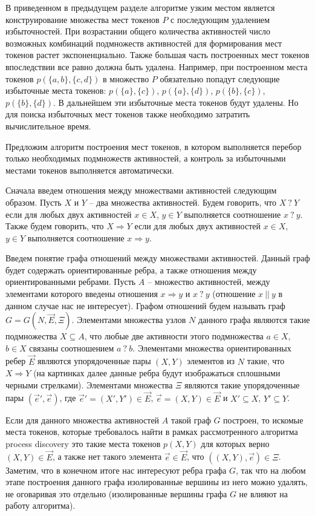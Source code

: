 \documentclass[
11pt,%
tightenlines,%
twoside,%
onecolumn,%
nofloats,%
nobibnotes,%
nofootinbib,%
superscriptaddress,%
noshowpacs,%
centertags]%
{revtex4}
\begin{document}
В приведенном в предыдущем разделе алгоритме узким местом является конструирование множества мест токенов $P$ с последующим удалением избыточностей.
При возрастании общего количества активностей число возможных комбинаций подмножеств активностей для формирования мест токенов растет экспоненциально.
Также большая часть построенных мест токенов впоследствии все равно должна быть удалена.
Например, при построенном места токенов $p(\{a, b\}, \{c, d\})$ в множество $P$ обязательно попадут следующие избыточные места токенов: $p(\{a\}, \{c\})$, $p(\{a\}, \{d\})$, $p(\{b\}, \{c\})$, $p(\{b\}, \{d\})$.
В дальнейшем эти избыточные места токенов будут удалены.
Но для поиска избыточных мест токенов также необходимо затратить вычислительное время.

Предложим алгоритм построения мест токенов, в котором выполняется перебор только необходимых подмножеств активностей, а контроль за избыточными местами токенов выполняется автоматически.

Сначала введем отношения между множествами активностей следующим образом.
Пусть $X$ и $Y$ -- два множества активностей.
Будем говорить, что $X \ ? \ Y$ если для любых двух активностей $x \in X$, $y \in Y$ выполняется соотношение $x \ ? \ y$.
Также будем говорить, что $X \Rightarrow Y$ если для любых двух активностей $x \in X$, $y \in Y$ выполняется соотношение $x \Rightarrow y$.

Введем понятие графа отношений между множествами активностей.
Данный граф будет содержать ориентированные ребра, а также отношения между ориентированными ребрами.
Пусть $A$ -- множество активностей, между элементами которого введены отношения $x \Rightarrow y$ и $x \ ? \ y$ (отношение $x \ || \ y$ в данном случае нас не интересует).
Графом отношений будем называть граф $G = G(N, \overrightarrow{E}, \Xi)$.
Элементами множества узлов $N$ данного графа являются такие подмножества $X \subseteq A$, что любые две активности этого подмножества $a \in X$, $b \in X$ связаны соотношением $a \ ? \ b$.
Элементами множества ориентированных ребер $\overrightarrow{E}$ являются упорядоченные пары $(X, Y)$ элементов из $N$ такие, что $X \Rightarrow Y$ (на картинках далее данные ребра будут изображаться сплошными черными стрелками).
Элементами множества $\Xi$ являются такие упорядоченные пары $(\overrightarrow{e}', \overrightarrow{e})$, где $\overrightarrow{e}' = (X', Y') \in \overrightarrow{E}$, $\overrightarrow{e} = (X, Y) \in \overrightarrow{E}$ и $X' \subseteq X$, $Y' \subseteq Y$.    

Если для данного множества активностей $A$ такой граф $G$ построен, то искомые места токенов, которые требовалось найти в рамках рассмотренного алгоритма process discovery это такие места токенов $p(X, Y)$ для которых верно $(X, Y) \in \overrightarrow{E}$, а также нет такого элемента $\overrightarrow{e} \in \overrightarrow{E}$, что $((X, Y), \overrightarrow{e}) \in \Xi$.
Заметим, что в конечном итоге нас интересуют ребра графа $G$, так что на любом этапе построения данного графа изолированные вершины из него можно удалять, не оговаривая это отдельно (изолированные вершины графа $G$ не влияют на работу алгоритма).
\end{document}
